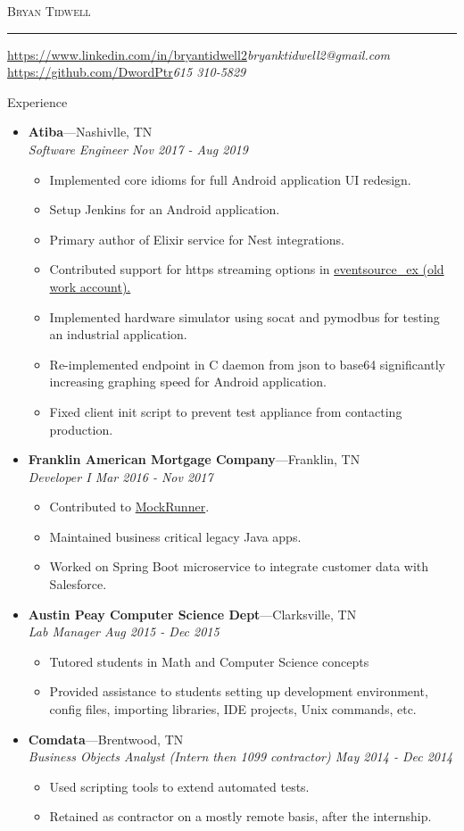 \documentclass[11pt,oneside]{article}
\makeatletter
\newcommand{\name}{Bryan Tidwell}
\newcommand{\email}{bryanktidwell2@gmail.com}
\newcommand{\github}{\url{https://github.com/DwordPtr}}
\newcommand{\linkedin}{\url{https://www.linkedin.com/in/bryantidwell2}}
\newcommand{\bigname}[1]{
	\begin{center}\fontfamily{phv}\selectfont\LARGE\scshape#1\end{center}
}
\newenvironment{ressection}[1]{
	\vspace{4pt}
	{\fontfamily{phv}\selectfont\Large#1}
	\begin{itemize}
	\vspace{3pt}
}{
	\end{itemize}
}
\newcommand{\ressubitem}[1]{
	\vspace{-1pt}
	\item \begin{flushleft} #1 \end{flushleft}
}
\newcommand{\resbigitem}[3]{
	\vspace{-5pt}
	\item
	\textbf{#1}---#2 \\
	\textit{#3}
}
\newenvironment{ressubsec}[3]{
	\resbigitem{#1}{#2}{#3}
	\vspace{-2pt}
	\begin{itemize}
}{
	\end{itemize}
}
\makeatother
\begin{document}
 \selectfont

\bigname{\name}

\vspace{-8pt} \rule{\textwidth}{1pt}

\vspace{-1pt} {\small \linkedin \small\itshape \hfill \email} \\
\vspace{-1pt} {\small \github \small\itshape \hfill 615 310-5829} \\
\vspace{3 pt}

\begin{ressection}{Experience}
        \begin{ressubsec}{Atiba}{Nashivlle, TN}{Software Engineer Nov 2017 - Aug 2019}
		\ressubitem{Implemented core idioms for full Android application UI redesign.}
		\ressubitem{Setup Jenkins for an Android application.}
		\ressubitem{Primary author of Elixir service for Nest integrations.}
        \ressubitem{Contributed support for https streaming options in \href{https://github.com/cwc/eventsource_ex/pull/10/files}{eventsource\_ex (old work account).}}
        \ressubitem{Implemented hardware simulator using socat and pymodbus for testing an industrial application.}
        \ressubitem{Re-implemented endpoint in C daemon from json to base64 significantly increasing graphing speed for Android application.}
		\ressubitem{Fixed client init script to prevent test appliance from contacting production.}
	\end{ressubsec}

			\begin{ressubsec}{Franklin American Mortgage Company}{Franklin, TN}{Developer I Mar 2016 - Nov 2017}
                    \ressubitem{Contributed to \href{https://github.com/mockrunner/mockrunner/pull/42}{MockRunner}.}
		\ressubitem{Maintained business critical legacy Java apps.}
		\ressubitem{Worked on Spring Boot microservice to integrate customer data with Salesforce.}
	\end{ressubsec}


	\begin{ressubsec}{Austin Peay Computer Science Dept}{Clarksville, TN}{Lab Manager Aug 2015 - Dec 2015}
		\ressubitem{Tutored students in Math and Computer Science concepts}
		\ressubitem{Provided assistance to students setting up development environment, config files, importing libraries, IDE projects, Unix commands, etc.}
	\end{ressubsec}

	\begin{ressubsec}{Comdata}{Brentwood, TN}{Business Objects Analyst (Intern then 1099 contractor) May 2014 - Dec 2014}
    \ressubitem{Used scripting tools to extend automated tests.}
    \ressubitem{Retained as contractor on a mostly remote basis, after the internship.}
	\end{ressubsec}

\end{ressection}
\end{document}
